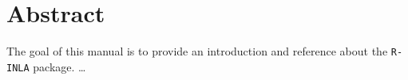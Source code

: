 \chapter*{Abstract}

The goal of this manual is to provide an introduction and reference
about the \verb|R-INLA| package. \ldots

